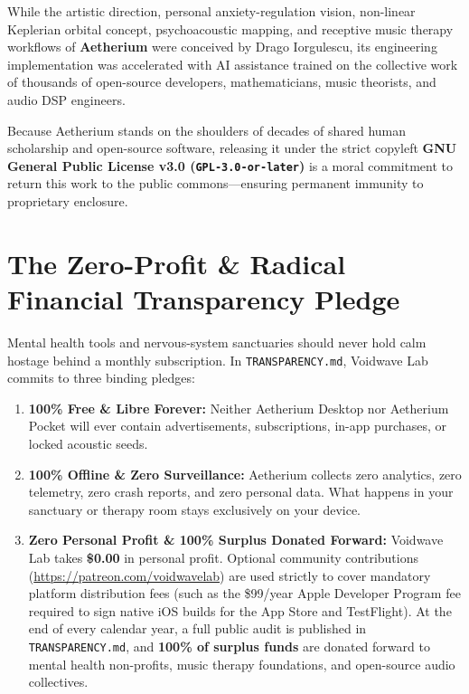 \documentclass[11pt,oneside,openany]{book}
\begin{document}
While the artistic direction, personal anxiety-regulation vision, non-linear Keplerian orbital concept, psychoacoustic mapping, and receptive music therapy workflows of \textbf{Aetherium} were conceived by Drago Iorgulescu, its engineering implementation was accelerated with AI assistance trained on the collective work of thousands of open-source developers, mathematicians, music theorists, and audio DSP engineers.

Because Aetherium stands on the shoulders of decades of shared human scholarship and open-source software, releasing it under the strict copyleft \textbf{GNU General Public License v3.0 (\texttt{GPL-3.0-or-later})} is a moral commitment to return this work to the public commons---ensuring permanent immunity to proprietary enclosure.

\section{The Zero-Profit \& Radical Financial Transparency Pledge}

Mental health tools and nervous-system sanctuaries should never hold calm hostage behind a monthly subscription. In \texttt{TRANSPARENCY.md}, Voidwave Lab commits to three binding pledges:
\begin{enumerate}
  \item \textbf{100\% Free \& Libre Forever:} Neither Aetherium Desktop nor Aetherium Pocket will ever contain advertisements, subscriptions, in-app purchases, or locked acoustic seeds.
  \item \textbf{100\% Offline \& Zero Surveillance:} Aetherium collects zero analytics, zero telemetry, zero crash reports, and zero personal data. What happens in your sanctuary or therapy room stays exclusively on your device.
  \item \textbf{Zero Personal Profit \& 100\% Surplus Donated Forward:} Voidwave Lab takes \textbf{\$0.00} in personal profit. Optional community contributions (\url{https://patreon.com/voidwavelab}) are used strictly to cover mandatory platform distribution fees (such as the \$99/year Apple Developer Program fee required to sign native iOS builds for the App Store and TestFlight). At the end of every calendar year, a full public audit is published in \texttt{TRANSPARENCY.md}, and \textbf{100\% of surplus funds} are donated forward to mental health non-profits, music therapy foundations, and open-source audio collectives.
\end{enumerate}
\end{document}
